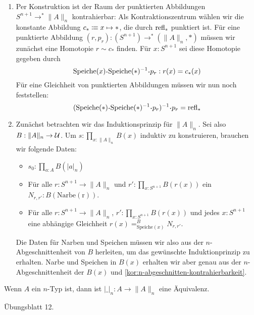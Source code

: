 \begin{beweis}
  \begin{enumerate}
  \item Per Konstruktion ist der Raum der punktierten Abbildungen $S^{n+1}\to^\ast\|A\|_n$ kontrahierbar: Als Kontraktionszentrum wählen wir die konstante Abbildung $c_\ast\vcentcolon\mspace{-1.2mu}\equiv x\mapsto \ast $, die durch $\mathrm{refl}_\ast$ punktiert ist.
    Für eine punktierte Abbildung $(r,p_r):(S^{n+1})\to^{\ast}(\|A\|_n,\ast)$ müssen wir zunächst eine Homotopie $r\sim c_\ast$ finden.
    Für $x:S^{n+1}$ sei diese Homotopie gegeben durch
    \[
      \mathrm{Speiche}(x)\kon \mathrm{Speiche}(\ast)^{-1}\kon p_r : r(x)=c_\ast(x)
    \]
    Für eine Gleichheit von punktierten Abbildungen müssen wir nun noch feststellen:
    \[
      (\mathrm{Speiche}(\ast)\kon \mathrm{Speiche}(\ast)^{-1}\kon p_r)^{-1}\kon p_r=\refl_\ast
    \]
  \item Zunächst betrachten wir das Induktionsprinzip für $ \|A\|_n$. Sei also $B:\|A\|_n\to \mathcal{U}$. Um $s:\prod_{x:\|A\|_n}B(x)$ induktiv zu konstruieren, brauchen wir folgende Daten:
    \begin{itemize}
    \item $s_0:\prod_{a:A}B(|a|_n)$ 
    \item Für alle $r:S^{n+1}\to \|A\|_n$ und $r':\prod_{x:S^{n+1}}B(r(x))$ ein $N_{r,r'}:B(\mathrm{Narbe(r)})$.
    \item Für alle $r:S^{n+1}\to \|A\|_n$, $r':\prod_{x:S^{n+1}}B(r(x))$ und jedes $x:S^{n+1}$ eine abhängige Gleichheit $r(x)=_{\mathrm{Speiche}(x)}^B N_{r,r'}$.
    \end{itemize}
    Die Daten für Narben und Speichen müssen wir also aus der $n$-Abgeschnittenheit von $B$ herleiten, um das gewünschte Induktionprinzip zu erhalten.
    Narbe und Speichen in $B(x)$  erhalten wir aber genau aus der $n$-Abgeschnittenheit der $B(x)$ und \cref{kor:n-abgeschnitten-kontrahierbarkeit}.
    
  \end{enumerate}
\end{beweis}

\begin{bemerkung}
  Wenn $A$ ein $n$-Typ ist, dann ist $|\_|_n:A\to \|A\|_n$ eine Äquivalenz.
\end{bemerkung}
\begin{beweis}
  Übungsblatt 12.
\end{beweis}

